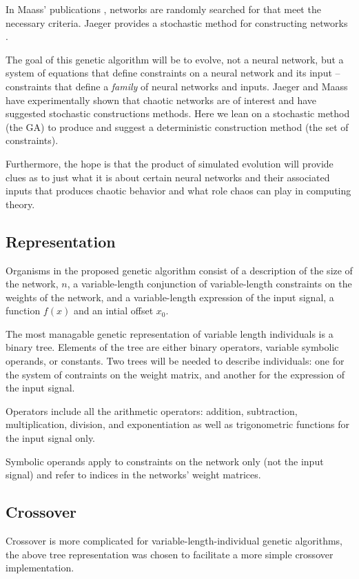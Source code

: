 \documentclass[12pt]{article}
\begin{document}
In Maass' publications \cite{maass_original},
networks are randomly searched for
that meet the necessary criteria.  Jaeger provides a stochastic method for
constructing networks \cite{jaeger_original}.

The goal of this genetic algorithm will
be to evolve, not a neural network, but a system of equations that define
constraints on a neural network and its input -- constraints that define a
\textit{family} of neural networks and inputs.  Jaeger and Maass have
experimentally shown that chaotic networks are of interest and have suggested
stochastic constructions methods.  Here we lean on a stochastic method (the GA)
to produce and suggest a deterministic construction method (the set of 
constraints).

Furthermore, the hope is that the product
of simulated evolution will provide clues as to just what it is about 
certain neural networks and their associated inputs that produces
chaotic behavior and what role chaos can play in computing theory.

\subsection{Representation}
Organisms in the proposed genetic algorithm consist of a description of the
size of the network, $n$, a variable-length conjunction of variable-length constraints on the weights of the network, and a variable-length expression of
the input signal, a function $f(x)$ and an intial offset $x_{0}$.

The most managable genetic representation of variable length individuals is
a binary tree.  Elements of the tree are either binary operators, variable
symbolic operands, or constants.  Two trees will be needed to describe 
individuals:  one for the system of contraints on the weight matrix, and 
another for the expression of the input signal.

Operators include all the arithmetic operators:  addition, subtraction, multiplication, division, and exponentiation as well as trigonometric functions for the
input signal only.

Symbolic operands apply to constraints on the network only (not the input
signal) and refer to indices in the networks' weight matrices.

\subsection{Crossover}
Crossover is more complicated for variable-length-individual genetic algorithms,
the above tree representation was chosen to facilitate a more simple crossover
implementation.
\end{document}
